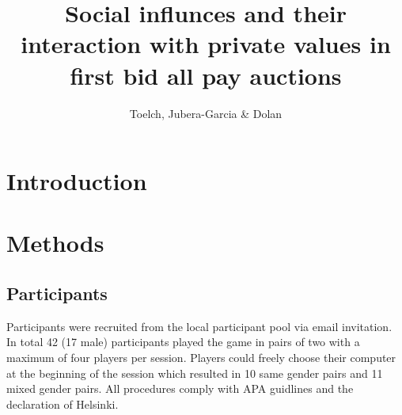 \documentclass [man]{apa6}
\title{Social influnces and their interaction with private values in first bid all pay auctions  }
\date{}
\author{Toelch, Jubera-Garcia \& Dolan}
\begin{document}
\maketitle

\section{Introduction}
\section {Methods}
\subsection{Participants}
Participants were recruited from the local participant pool via email invitation. In total 42 (17 male) participants played the game in pairs of two with a maximum of four players per session. Players could freely choose their computer at the beginning of the session which resulted in 10 same gender pairs and 11 mixed gender pairs. All procedures comply with APA guidlines and the declaration of Helsinki. 
\end{document}
